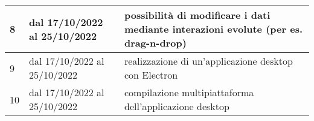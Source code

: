 \begin{center}
\begin{tabular}{ |p{1cm}|p{}|p{}| }
    \hline
    8                                        & dal 17/10/2022 al 25/10/2022 & possibilità di modificare i dati mediante interazioni evolute (per es. drag-n-drop) \\
    \hline
    9                                        & dal 17/10/2022 al 25/10/2022 & realizzazione di un'applicazione desktop con Electron                               \\
    \hline
    10                                       & dal 17/10/2022 al 25/10/2022 & compilazione multipiattaforma dell'applicazione desktop                             \\
    \hline
  \end{tabular}
\end{center}



